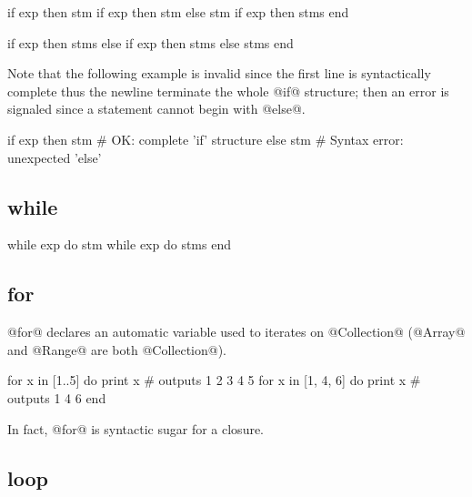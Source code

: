 \begin{multicols}{2}
\begin{lst}
if exp then stm
if exp then stm else stm
if exp then
	stms
end
\end{lst}
\columnbreak
\begin{lst}
if exp then
	stms
else if exp then
	stms
else
	stms
end
\end{lst}
\end{multicols}
Note that the following example is invalid since the first line is syntactically complete thus the newline terminate the whole @if@ structure; then an error is signaled since a statement cannot begin with @else@.
\begin{lst}
if exp then stm # OK: complete 'if' structure
else stm # Syntax error: unexpected 'else'
\end{lst}

\subsection{while}\label{while}

\begin{lst}
while exp do stm
while exp do
	stms
end
\end{lst}

\subsection{for}\label{for}

@for@ declares an automatic variable used to iterates on @Collection@ (@Array@ and @Range@ are both @Collection@).

\begin{lst}
for x in [1..5] do print x # outputs 1 2 3 4 5
for x in [1, 4, 6] do
	print x # outputs 1 4 6
end
\end{lst}

In fact, @for@ is syntactic sugar for a closure.

\subsection{loop}\label{loop}

